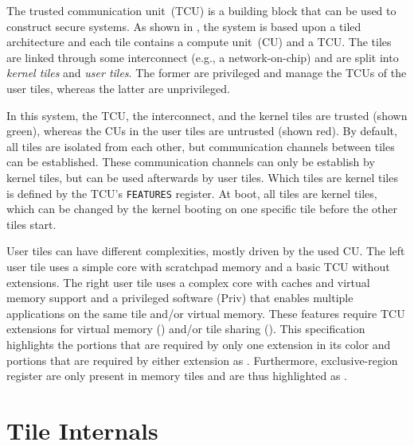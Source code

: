 \noindent The trusted communication unit~(TCU) is a building block that can be used to construct
secure systems. As shown in , the system is based upon a tiled architecture
and each tile contains a compute unit~(CU) and a TCU. The tiles are linked through some interconnect
(e.g., a network-on-chip) and are split into \emph{kernel tiles} and \emph{user tiles}. The former
are privileged and manage the TCUs of the user tiles, whereas the latter are unprivileged.

In this system, the TCU, the interconnect, and the kernel tiles are trusted (shown green), whereas the
CUs in the user tiles are untrusted (shown red). By default, all tiles are isolated from each other, but
communication channels between tiles can be established. These communication channels can only be
establish by kernel tiles, but can be used afterwards by user tiles. Which tiles are kernel tiles is defined
by the TCU's \texttt{FEATURES} register. At boot, all tiles are kernel tiles, which can be changed by
the kernel booting on one specific tile before the other tiles start.

User tiles can have different complexities, mostly driven by the used CU. The left user tile uses a
simple core with scratchpad memory and a basic TCU without extensions. The right user tile uses a
complex core with caches and virtual memory support and a privileged software (Priv) that enables
multiple applications on the same tile and/or virtual memory. These features require TCU extensions
for virtual memory () and/or tile sharing (). This specification highlights
the portions that are required by only one extension in its color and portions that are required by
either extension as . Furthermore, exclusive-region register are only present in
memory tiles and are thus highlighted as .

\section{Tile Internals}

